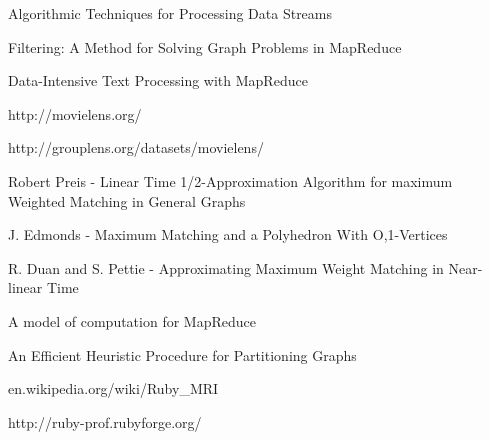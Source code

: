  \begin{thebibliography}{99}

  Algorithmic Techniques for Processing Data Streams

  Filtering: A Method for Solving Graph Problems in MapReduce
  
  Data-Intensive Text Processing with MapReduce
  
  http://movielens.org/
  
  http://grouplens.org/datasets/movielens/
  
  Robert Preis - Linear Time 1/2-Approximation Algorithm for maximum Weighted Matching in General Graphs
  
  J. Edmonds - Maximum Matching and a Polyhedron With O,1-Vertices

  R. Duan and S. Pettie - Approximating Maximum Weight Matching in Near-linear Time

  A model of computation for MapReduce

  An Efficient Heuristic Procedure for Partitioning Graphs
  
  en.wikipedia.org/wiki/Ruby\_MRI
  
  http://ruby-prof.rubyforge.org/
  
  \end{thebibliography}
